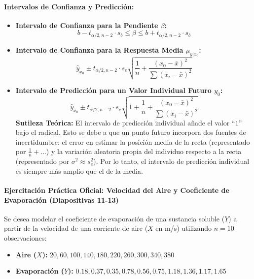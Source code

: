 \documentclass[11pt,letterpaper]{article}
\begin{document}
\paragraph{Intervalos de Confianza y Predicción:}
\begin{itemize}
    \item \textbf{Intervalo de Confianza para la Pendiente $\beta$:}
    \begin{equation}
        b - t_{\alpha/2, n-2} \cdot s_b \le \beta \le b + t_{\alpha/2, n-2} \cdot s_b
    \end{equation}
    \item \textbf{Intervalo de Confianza para la Respuesta Media $\mu_{y|x_0}$:}
    \begin{equation}
        \hat{y}_{x_0} \pm t_{\alpha/2, n-2} \cdot s_e \sqrt{\frac{1}{n} + \frac{(x_0 - \bar{x})^2}{\sum (x_i - \bar{x})^2}}
    \end{equation}
    \item \textbf{Intervalo de Predicción para un Valor Individual Futuro $y_0$:}
    \begin{equation}
        \hat{y}_{x_0} \pm t_{\alpha/2, n-2} \cdot s_e \sqrt{1 + \frac{1}{n} + \frac{(x_0 - \bar{x})^2}{\sum (x_i - \bar{x})^2}}
    \end{equation}
    \textbf{Sutileza Teórica:} El intervalo de predicción individual añade el valor ``$1$'' bajo el radical. Esto se debe a que un punto futuro incorpora dos fuentes de incertidumbre: el error en estimar la posición media de la recta (representado por $\frac{1}{n} + \dots$) y la variación aleatoria propia del individuo respecto a la recta (representado por $\sigma^2 \approx s_e^2$). Por lo tanto, el intervalo de predicción individual es siempre más amplio que el de la media.
\end{itemize}

\paragraph{Ejercitación Práctica Oficial: Velocidad del Aire y Coeficiente de Evaporación (Diapositivas 11-13)}
Se desea modelar el coeficiente de evaporación de una sustancia soluble ($Y$) a partir de la velocidad de una corriente de aire ($X$ en m/s) utilizando $n=10$ observaciones:
\begin{itemize}
    \item \textbf{Aire ($X$):} $20, 60, 100, 140, 180, 220, 260, 300, 340, 380$
    \item \textbf{Evaporación ($Y$):} $0.18, 0.37, 0.35, 0.78, 0.56, 0.75, 1.18, 1.36, 1.17, 1.65$
\end{itemize}
\end{document}

